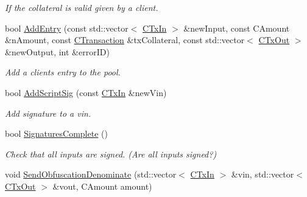 \begin{DoxyCompactItemize}
\begin{DoxyCompactList}\small\item\em If the collateral is valid given by a client. \end{DoxyCompactList}\item 
\mbox{\label{class_c_obfuscation_pool_a659e75eaf53a3b01d34a685bd9445628}} 
bool \mbox{\hyperlink{class_c_obfuscation_pool_a659e75eaf53a3b01d34a685bd9445628}{Add\+Entry}} (const std\+::vector$<$ \mbox{\hyperlink{class_c_tx_in}{C\+Tx\+In}} $>$ \&new\+Input, const C\+Amount \&n\+Amount, const \mbox{\hyperlink{class_c_transaction}{C\+Transaction}} \&tx\+Collateral, const std\+::vector$<$ \mbox{\hyperlink{class_c_tx_out}{C\+Tx\+Out}} $>$ \&new\+Output, int \&error\+ID)
\begin{DoxyCompactList}\small\item\em Add a clients entry to the pool. \end{DoxyCompactList}\item 
\mbox{\label{class_c_obfuscation_pool_a16f7236ff87ac90d963a31631fa861d6}} 
bool \mbox{\hyperlink{class_c_obfuscation_pool_a16f7236ff87ac90d963a31631fa861d6}{Add\+Script\+Sig}} (const \mbox{\hyperlink{class_c_tx_in}{C\+Tx\+In}} \&new\+Vin)
\begin{DoxyCompactList}\small\item\em Add signature to a vin. \end{DoxyCompactList}\item 
\mbox{\label{class_c_obfuscation_pool_aa7b9edff72efc61033a7801eddfaeb7b}} 
bool \mbox{\hyperlink{class_c_obfuscation_pool_aa7b9edff72efc61033a7801eddfaeb7b}{Signatures\+Complete}} ()
\begin{DoxyCompactList}\small\item\em Check that all inputs are signed. (Are all inputs signed?) \end{DoxyCompactList}\item 
\mbox{\label{class_c_obfuscation_pool_a447a060009578d9cb4eed0a095baa1d6}} 
void \mbox{\hyperlink{class_c_obfuscation_pool_a447a060009578d9cb4eed0a095baa1d6}{Send\+Obfuscation\+Denominate}} (std\+::vector$<$ \mbox{\hyperlink{class_c_tx_in}{C\+Tx\+In}} $>$ \&vin, std\+::vector$<$ \mbox{\hyperlink{class_c_tx_out}{C\+Tx\+Out}} $>$ \&vout, C\+Amount amount)

\end{DoxyCompactItemize}
